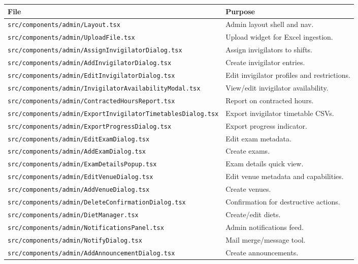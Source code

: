 \begin{longtable}{p{}p{}}
\toprule
\textbf{File} & \textbf{Purpose} \\
\midrule
\texttt{src/components/admin/Layout.tsx} & Admin layout shell and nav. \\
\texttt{src/components/admin/UploadFile.tsx} & Upload widget for Excel ingestion. \\
\texttt{src/components/admin/AssignInvigilatorDialog.tsx} & Assign invigilators to shifts. \\
\texttt{src/components/admin/AddInvigilatorDialog.tsx} & Create invigilator entries. \\
\texttt{src/components/admin/EditInvigilatorDialog.tsx} & Edit invigilator profiles and restrictions. \\
\texttt{src/components/admin/InvigilatorAvailabilityModal.tsx} & View/edit invigilator availability. \\
\texttt{src/components/admin/ContractedHoursReport.tsx} & Report on contracted hours. \\
\texttt{src/components/admin/ExportInvigilatorTimetablesDialog.tsx} & Export invigilator timetable CSVs. \\
\texttt{src/components/admin/ExportProgressDialog.tsx} & Export progress indicator. \\
\texttt{src/components/admin/EditExamDialog.tsx} & Edit exam metadata. \\
\texttt{src/components/admin/AddExamDialog.tsx} & Create exams. \\
\texttt{src/components/admin/ExamDetailsPopup.tsx} & Exam details quick view. \\
\texttt{src/components/admin/EditVenueDialog.tsx} & Edit venue metadata and capabilities. \\
\texttt{src/components/admin/AddVenueDialog.tsx} & Create venues. \\
\texttt{src/components/admin/DeleteConfirmationDialog.tsx} & Confirmation for destructive actions. \\
\texttt{src/components/admin/DietManager.tsx} & Create/edit diets. \\
\texttt{src/components/admin/NotificationsPanel.tsx} & Admin notifications feed. \\
\texttt{src/components/admin/NotifyDialog.tsx} & Mail merge/message tool. \\
\texttt{src/components/admin/AddAnnouncementDialog.tsx} & Create announcements. \\
\bottomrule
\end{longtable}

